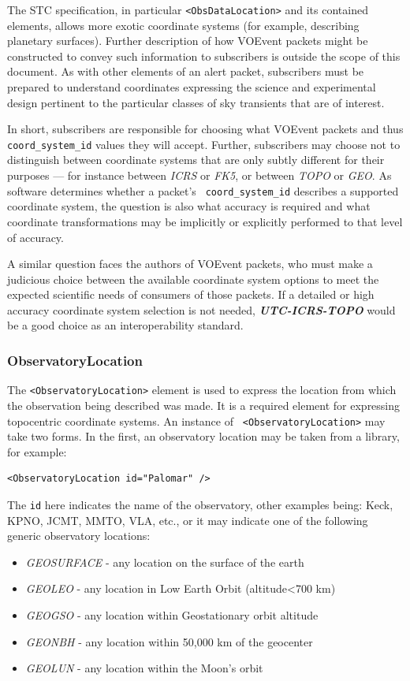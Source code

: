 \documentclass[11pt,a4paper]{ivoa}
\begin{document}
The STC specification, in particular {\tt <ObsDataLocation>} and its contained 
elements, allows more exotic coordinate systems (for example, describing 
planetary surfaces). Further description of how VOEvent packets might be 
constructed to convey such information to subscribers is outside the scope of 
this document. As with other elements of an alert packet, subscribers must be 
prepared to understand coordinates expressing the science and experimental 
design pertinent to the particular classes of sky transients that are of 
interest. 

In short, subscribers are responsible for choosing what VOEvent packets and thus
{\tt coord\_system\_id} values they will accept. Further, subscribers may choose
not to distinguish between coordinate systems that are only subtly different for
their purposes --- for instance between \emph{ICRS} or \emph{FK5}, or between 
\emph{TOPO} or \emph{GEO}. As software determines whether a packet's {\tt 
coord\_system\_id} describes a supported coordinate system, the question is also
what accuracy is required and what coordinate transformations may be implicitly 
or explicitly performed to that level of accuracy. 

A similar question faces the authors of VOEvent packets, who must make a 
judicious choice between the available coordinate system options to meet the 
expected scientific needs of consumers of those packets. If a detailed or high 
accuracy coordinate system selection is not needed, \emph{\bf UTC-ICRS-TOPO} 
would be a good choice as an interoperability standard. 

\subsubsection{ObservatoryLocation}
\label{sec:3.4.2}
The {\tt <ObservatoryLocation>} element is used to express the location from 
which the observation being described was made. It is a required element for 
expressing topocentric coordinate systems. An instance of {\tt 
<ObservatoryLocation>} may take two forms. In the first, an observatory location
may be taken from a library, for example: 
{\footnotesize
\begin{verbatim}
<ObservatoryLocation id="Palomar" /> 
\end{verbatim}}
The {\tt id} here indicates the name of the observatory, other examples being: 
Keck, KPNO, JCMT, MMTO, VLA, etc., or it may indicate one of the following 
generic observatory locations: 
\begin{itemize}
\item \emph{GEOSURFACE} - any location on the surface of the earth
\item \emph{GEOLEO} - any location in Low Earth Orbit (altitude<700 km)
\item \emph{GEOGSO} - any location within Geostationary orbit altitude
\item \emph{GEONBH} - any location within 50,000 km of the geocenter
\item \emph{GEOLUN} - any location within the Moon's orbit
\end{itemize}
\end{document}
